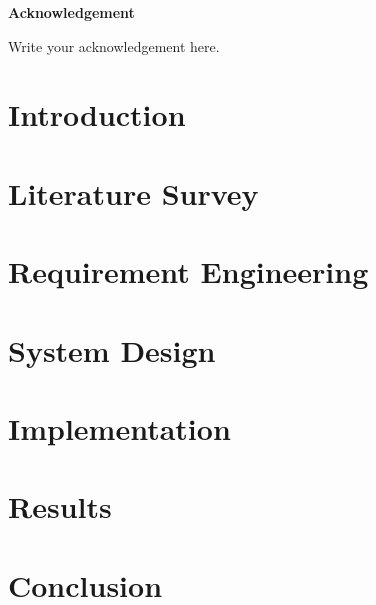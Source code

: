 \documentclass[a4paper, 11pt, oneside]{report}
\begin{document}
\begin{abstract}
	


\end{abstract}

\pagebreak
	

        \begin{center}
            { \LARGE \textbf{Acknowledgement}}
        \end{center}
	\vspace{2cm}
	Write your acknowledgement here.
	
	
	\vspace{1cm}
	
	\hspace{7cm}
	\tableofcontents
	\listoffigures
        \listoftables
	\chapter{Introduction}
	
        \chapter{Literature Survey}
        
        \chapter{Requirement Engineering}
        
        \chapter{System Design}
        
        \chapter{Implementation}
        
        \chapter{Results}
        
        \chapter{Conclusion}
        
        
        
	
        
	
	
	
	
\end{document}
